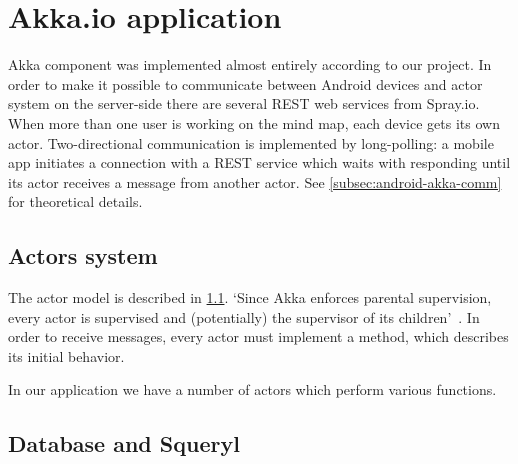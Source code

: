 %
%
%
%
%

\section{Akka.io application}
\label{sec:akka-app}
Akka component was implemented almost entirely according to our project. In order to make it possible to communicate between Android devices and actor system on the server-side there are several REST web services from Spray.io. When more than one user is working on the mind map, each device gets its own actor.  Two-directional communication is implemented by long-polling: a mobile app initiates a connection with a REST service which waits with responding until its actor receives a message from another actor. See \cref{subsec:android-akka-comm} for theoretical details.  

\subsection{Actors system }
\label{subsection:akka-actors}
The actor model is described in \cref{subsection:akka-actors}. `Since Akka enforces parental supervision, every actor is supervised and (potentially) the supervisor of its children'~\cite{AkkaDoc:2013:Actors}. In order to receive messages, every actor must implement a  method, which describes its initial behavior.

In our application we have a number of actors which perform various functions.


\subsection{Database and Squeryl}
\label{subsection:akka-database}

